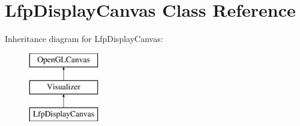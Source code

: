 \hypertarget{classLfpDisplayCanvas}{\section{Lfp\-Display\-Canvas Class Reference}
\label{classLfpDisplayCanvas}
}
Inheritance diagram for Lfp\-Display\-Canvas\-:\begin{figure}[H]
\begin{center}
\leavevmode
\includegraphics[height=3.000000cm]{classLfpDisplayCanvas}
\end{center}
\end{figure}
